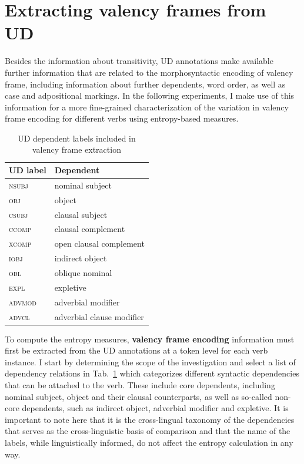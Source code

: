 \section{Extracting valency frames from UD}

Besides the information about transitivity, UD annotations make available further information that are related to the morphosyntactic encoding of valency frame, including information about further dependents, word order, as well as case and adpositional markings. In the following experiments, I make use of this information for a more fine-grained characterization of the variation in valency frame encoding for different verbs using entropy-based measures.

\begin{table}
  \centering
  \begin{tabular}{ll}
    \toprule
    \textbf{UD label} & \textbf{Dependent} \\
    \midrule
    \textsc{nsubj} & nominal subject \\
    \textsc{obj} & object \\
    \textsc{csubj} & clausal subject \\
    \textsc{ccomp} & clausal complement \\
    \textsc{xcomp}   & open clausal complement \\
    \midrule
    \textsc{iobj} & indirect object \\
    \textsc{obl} & oblique nominal \\
    \textsc{expl} & expletive \\
    \textsc{advmod} & adverbial modifier \\
    \textsc{advcl} & adverbial clause modifier \\
    \bottomrule
  \end{tabular}
  \caption{UD dependent labels included in valency frame extraction}\label{tab:ud-dependent-labels}
\end{table}

To compute the entropy measures,  \textbf{valency frame encoding} information must first be extracted from the UD annotations at a token level for each verb instance. I start by determining the scope of the investigation and select a list of dependency relations in Tab.~\ref{tab:ud-dependent-labels} which categorizes different syntactic dependencies that can be attached to the verb. These include core dependents, including nominal subject, object and their clausal counterparts, as well as so-called non-core dependents, such as indirect object, adverbial modifier and expletive.  It is important to note here that it is the cross-lingual taxonomy of the dependencies that serves as the cross-linguistic basis of comparison and that the name of the labels, while linguistically informed, do not affect the entropy calculation in any way.

